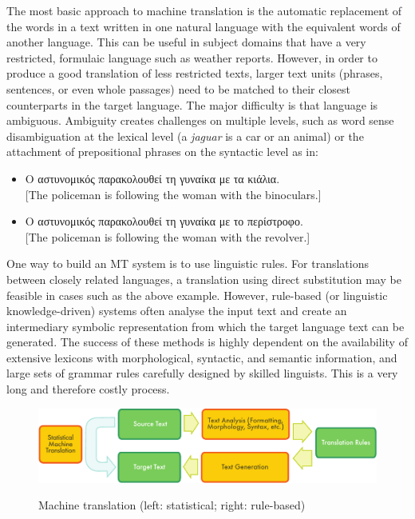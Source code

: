 \begin{multicols}{2}
The most basic approach to machine translation is the automatic replacement of the words in a text written in one natural language with the equivalent words of another language. This can be useful in subject domains that have a very restricted, formulaic language such as weather reports. However, in order to produce a good translation of less restricted texts, larger text units (phrases, sentences, or even whole passages) need to be matched to their closest counterparts in the target language. The major difficulty is that language is ambiguous. Ambiguity creates challenges on multiple levels, such as word sense disambiguation at the lexical level (a \textit{jaguar} is a car or an animal) or the attachment of prepositional phrases on the syntactic level as in:

\begin{itemize}
\item Ο αστυνομικός παρακολουθεί τη γυναίκα με τα κιάλια.\\
{[}The policeman is following the woman with the binoculars.{]} 
\item Ο αστυνομικός παρακολουθεί τη γυναίκα με το περίστροφο.\\
{[}The policeman is following the woman with the revolver.{]}
\end{itemize}

One way to build an MT system is to use linguistic rules. For translations between closely related languages, a translation using direct substitution may be feasible in cases such as the above example. However, rule-based (or linguistic knowledge-driven) systems often analyse the input text and create an intermediary symbolic representation from which the target language text can be generated. The success of these methods is highly dependent on the availability of extensive lexicons with morphological, syntactic, and semantic information, and large sets of grammar rules carefully designed by skilled linguists. This is a very long and therefore costly process.

\begin{figure}[htb]
  \center
  \includegraphics[width=\textwidth]{../_media/english/machine_translation}
  \caption{Machine translation (left: statistical; right: rule-based)}
   \label{fig:mtarch_en}
\end{figure}
 

\end{multicols}
